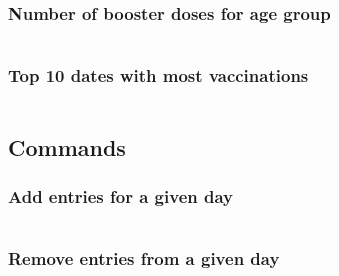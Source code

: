\documentclass[12pt, a4paper]{article}
\begin{document}
\begin{tcolorbox}[fontupper=\scriptsize]
    \begin{verbatim}
    \end{verbatim}
\end{tcolorbox}

\noindent
\blindtext

\subsubsection{Number of booster doses for age group}

\begin{tcolorbox}[fontupper=\scriptsize]
    \begin{verbatim}
    \end{verbatim}
\end{tcolorbox}

\noindent
\blindtext

\subsubsection{Top 10 dates with most vaccinations}

\begin{tcolorbox}[fontupper=\scriptsize]
    \begin{verbatim}
    \end{verbatim}
\end{tcolorbox}

\noindent
\blindtext

\subsection{Commands}


\subsubsection{Add entries for a given day}

\begin{tcolorbox}[fontupper=\scriptsize]
    \begin{verbatim}
    \end{verbatim}
\end{tcolorbox}

\noindent
\blindtext

\subsubsection{Remove entries from a given day}
\end{document}
